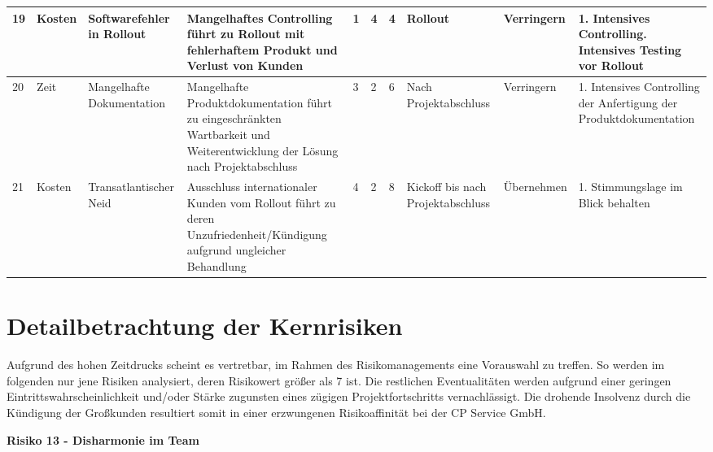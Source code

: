 \begin{landscape}
\begin{longtable}{| P{0.5cm} | P{1.7cm} | P{3cm} | P{5cm} | P{1cm} | P{1cm} | P{1cm} | P{2.2cm} | P{2cm} | P{5cm} |}
	19&Kosten&Softwarefehler in  Rollout&Mangelhaftes Controlling führt zu Rollout mit fehlerhaftem Produkt und Verlust von Kunden&1&4&4&Rollout&Verringern&
	1. Intensives Controlling. Intensives Testing vor Rollout\\ 
	\hline
	
	20&Zeit&Mangelhafte Dokumentation&Mangelhafte Produktdokumentation führt zu eingeschränkten Wartbarkeit und Weiterentwicklung der Lösung nach Projektabschluss&3&2&6&Nach Projektabschluss&Verringern&
	1. Intensives Controlling der Anfertigung der Produktdokumentation\\ 
	\hline
	
	21&Kosten&Transatlantischer Neid&Ausschluss internationaler Kunden vom Rollout führt zu deren Unzufriedenheit/Kündigung aufgrund ungleicher Behandlung&4&2&8&Kickoff bis nach Projektabschluss&Übernehmen&
	1. Stimmungslage im Blick behalten\\ 
	\hline
	

\end{longtable}
 \label{tab:risikotb}
\end{landscape}
\pagestyle{headings}
\restoregeometry
\normalsize

\section{Detailbetrachtung der Kernrisiken}

Aufgrund des hohen Zeitdrucks scheint es vertretbar, im Rahmen des Risikomanagements eine Vorauswahl zu treffen. So werden im folgenden nur jene Risiken analysiert, deren Risikowert größer als 7 ist. Die restlichen Eventualitäten werden aufgrund einer geringen Eintrittswahrscheinlichkeit und/oder Stärke zugunsten eines zügigen Projektfortschritts vernachlässigt. Die drohende Insolvenz durch die Kündigung der Großkunden resultiert somit in einer erzwungenen Risikoaffinität bei der CP Service GmbH.



\vspace*{0.3cm}
\textbf{Risiko 13 - Disharmonie im Team}
\vspace*{0.1cm}

